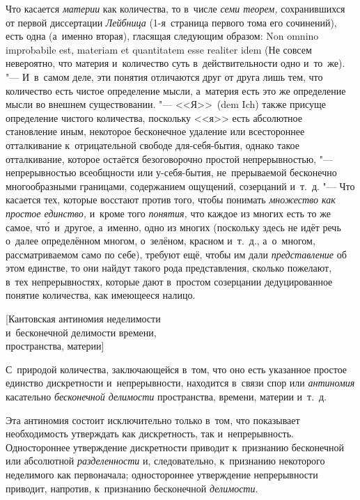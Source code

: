 Что касается {\em материи} как количества, то в~числе {\em семи теорем,}
сохранившихся от первой диссертации {\em Лейбница} (1-я~страница первого тома его сочинений), есть одна
(а~именно вторая), гласящая следующим образом: Non omnino impro\-babi\-le est,
mate\-riam et quanti\-tatem esse reali\-ter idem (Не совсем невероятно, что
материя и~количество суть в~действительности одно и~то~же). "--- И~в~самом
деле, эти понятия отличаются друг от друга лишь тем, что количество есть
чистое определение мысли, а~материя есть это же определение мысли во внешнем
существовании. "--- <<Я>>~(dem Ich) также присуще определение чистого
количества, поскольку <<я>> есть абсолютное становление иным, некоторое
бесконечное удаление или всестороннее отталкивание к~отрицательной свободе
для-себя-бытия, однако такое отталкивание, которое остаётся безоговорочно
простой непрерывностью, "--- непрерывностью всеобщности или у-себя-бытия,
не~прерываемой бесконечно многообразными границами, содержанием ощущений,
созерцаний и~т.~д. "--- Что касается тех, которые восстают против того, чтобы
понимать {\em множество как простое единство,} и~кроме того {\em понятия,} что
каждое из многих есть то же самое, чт\'{о}~и~другое, а~именно, одно из многих
(поскольку здесь не идёт речь о~далее определённом многом, о~зелёном, красном
и~т.~д., а~о~многом, рассматриваемом само по себе), требуют ещё, чтобы им дали
{\em представление} об этом единстве, то они найдут такого рода представления,
сколько пожелают, в~тех непрерывностях, которые дают в~простом созерцании
дедуцированное понятие количества, как имеющееся налицо.

%
{[Кантовская антиномия неделимости\\и~бесконечной делимости времени,\\
пространства, материи]}

\label{bkm:bm88a}С~природой количества, заключающейся в~том, что оно есть
указанное простое единство дискретности и~непрерывности, находится в~связи спор
или {\em антиномия} касательно {\em бесконечной делимости} пространства,
времени, материи и~т.~д.

Эта антиномия состоит исключительно только в~том, что показывает необходимость
утверждать как дискретность, так и~непрерывность. Одностороннее утверждение
дискретности приводит к~признанию бесконечной или абсолютной
{\em разделенности} и, следовательно, к~признанию некоторого неделимого как
первоначала; одностороннее утверждение непрерывности приводит, напротив,
к~признанию бесконечной {\em делимости}.

